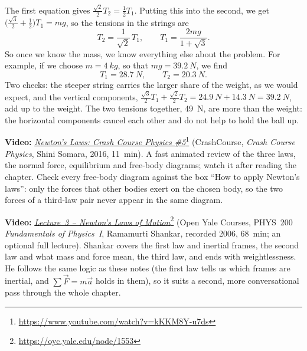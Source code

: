 \documentclass[11pt,a4paper]{article}
\begin{document}
The first equation gives $\frac{\sqrt{2}}{2}T_2 = \frac{1}{2}T_1$. Putting this into the second, we
get $\bigl(\frac{\sqrt{3}}{2} + \frac{1}{2}\bigr)T_1 = mg$, so the tensions in the strings are
\begin{equation}\label{eq:hang-T}
  T_2 = \frac{1}{\sqrt{2}}\,T_1 , \qquad T_1 = \frac{2mg}{1 + \sqrt{3}} .
\end{equation}
So once we know the mass, we know everything else about the problem. For example, if we choose $m =
\qty{4}{kg}$, so that $mg = \qty{39.2}{N}$, we find
\begin{equation}\label{eq:hang-num}
  T_1 = \qty{28.7}{N} , \qquad T_2 = \qty{20.3}{N} .
\end{equation}
Two checks: the steeper string carries the larger share of the weight, as we would expect, and the
vertical components, $\frac{\sqrt{3}}{2}T_1 + \frac{\sqrt{2}}{2}T_2 = \qty{24.9}{N} +
\qty{14.3}{N} = \qty{39.2}{N}$, add up to the weight. The two tensions together, \qty{49}{N}, are
more than the weight: the horizontal components cancel each other and do not help to hold the ball
up.

\begin{aside}
\textbf{Video:}
\href{https://www.youtube.com/watch?v=kKKM8Y-u7ds}{\emph{Newton's Laws: Crash Course Physics
\#5}}\footnote{\url{https://www.youtube.com/watch?v=kKKM8Y-u7ds}} (CrashCourse, \emph{Crash
Course Physics}, Shini Somara, 2016, 11~min). A fast animated review of the three laws, the
normal force, equilibrium and free-body diagrams; watch it after reading the chapter. Check every
free-body diagram against the box ``How to apply Newton's laws'': only the forces that other bodies
exert on the chosen body, so the two forces of a third-law pair never appear in the same diagram.

\smallskip
\textbf{Video:} \href{https://oyc.yale.edu/node/1553}{\emph{Lecture~3 -- Newton's Laws of
Motion}}\footnote{\url{https://oyc.yale.edu/node/1553}} (Open Yale Courses, PHYS~200
\emph{Fundamentals of Physics~I}, Ramamurti Shankar, recorded 2006, 68~min; an optional full
lecture). Shankar covers the first law and inertial frames, the second law and what mass and force
mean, the third law, and ends with weightlessness. He follows the same logic as these notes (the
first law tells us which frames are inertial, and $\sum\vec{F} = m\vec{a}$ holds in them), so it
suits a second, more conversational pass through the whole chapter.
\end{aside}

\end{document}

